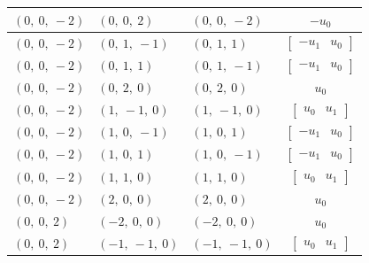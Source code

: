 \documentclass[11pt]{article}
\theoremstyle{definition}
\begin{document}
\begin{longtable}{|l|l|l|c|}
    \hline
    $\left( 0, \  0, \  -2\right)$ & $\left( 0, \  0, \  2\right)$ & $\left( 0, \  0, \  -2\right)$ & $- u_{0}$ \\
    \hline
    $\left( 0, \  0, \  -2\right)$ & $\left( 0, \  1, \  -1\right)$ & $\left( 0, \  1, \  1\right)$ & $\left[\begin{matrix}- u_{1} & u_{0}\end{matrix}\right]$ \\
    \hline
    $\left( 0, \  0, \  -2\right)$ & $\left( 0, \  1, \  1\right)$ & $\left( 0, \  1, \  -1\right)$ & $\left[\begin{matrix}- u_{1} & u_{0}\end{matrix}\right]$ \\
    \hline
    $\left( 0, \  0, \  -2\right)$ & $\left( 0, \  2, \  0\right)$ & $\left( 0, \  2, \  0\right)$ & $u_{0}$ \\
    \hline
    $\left( 0, \  0, \  -2\right)$ & $\left( 1, \  -1, \  0\right)$ & $\left( 1, \  -1, \  0\right)$ & $\left[\begin{matrix}u_{0} & u_{1}\end{matrix}\right]$ \\
    \hline
    $\left( 0, \  0, \  -2\right)$ & $\left( 1, \  0, \  -1\right)$ & $\left( 1, \  0, \  1\right)$ & $\left[\begin{matrix}- u_{1} & u_{0}\end{matrix}\right]$ \\
    \hline
    $\left( 0, \  0, \  -2\right)$ & $\left( 1, \  0, \  1\right)$ & $\left( 1, \  0, \  -1\right)$ & $\left[\begin{matrix}- u_{1} & u_{0}\end{matrix}\right]$ \\
    \hline
    $\left( 0, \  0, \  -2\right)$ & $\left( 1, \  1, \  0\right)$ & $\left( 1, \  1, \  0\right)$ & $\left[\begin{matrix}u_{0} & u_{1}\end{matrix}\right]$ \\
    \hline
    $\left( 0, \  0, \  -2\right)$ & $\left( 2, \  0, \  0\right)$ & $\left( 2, \  0, \  0\right)$ & $u_{0}$ \\
    \hline
    $\left( 0, \  0, \  2\right)$ & $\left( -2, \  0, \  0\right)$ & $\left( -2, \  0, \  0\right)$ & $u_{0}$ \\
    \hline
    $\left( 0, \  0, \  2\right)$ & $\left( -1, \  -1, \  0\right)$ & $\left( -1, \  -1, \  0\right)$ & $\left[\begin{matrix}u_{0} & u_{1}\end{matrix}\right]$ \\

\end{longtable}
\end{document}
